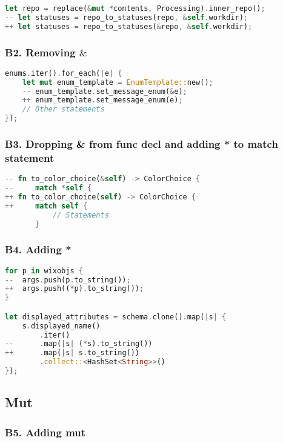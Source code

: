 \documentclass{article}
\begin{document}
\begin{lstlisting}[language=Rust, style=colouredRust, label={l3}]
let repo = replace(&mut *contents, Processing).inner_repo();
-- let statuses = repo_to_statuses(repo, &self.workdir);
++ let statuses = repo_to_statuses(&repo, &self.workdir);
\end{lstlisting}


\subsubsection{B2. Removing $\&$}


\begin{lstlisting}[language=Rust, style=colouredRust, label={l3}]
enums.iter().for_each(|e| {
    let mut enum_template = EnumTemplate::new();
    -- enum_template.set_message_enum(&e);
    ++ enum_template.set_message_enum(e);
    // Other statements
});
\end{lstlisting}


\subsubsection{B3. Dropping & from func decl and adding * to match statement}

\begin{lstlisting}[language=Rust, style=colouredRust, label={l3}]
-- fn to_color_choice(&self) -> ColorChoice {
--     match *self {
++ fn to_color_choice(self) -> ColorChoice {
++     match self {
           // Statements
       }
\end{lstlisting}

\subsubsection{B4. Adding *}

\begin{lstlisting}[language=Rust, style=colouredRust, label={l3}]
for p in wixobjs {
--  args.push(p.to_string());
++  args.push((*p).to_string());
}

let displayed_attributes = schema.clone().map(|s| {
    s.displayed_name()
        .iter()
--      .map(|s| (*s).to_string())
++      .map(|s| s.to_string())
        .collect::<HashSet<String>>()
});
\end{lstlisting}

\subsection{Mut}
\subsubsection{B5. Adding mut}
\end{document}
